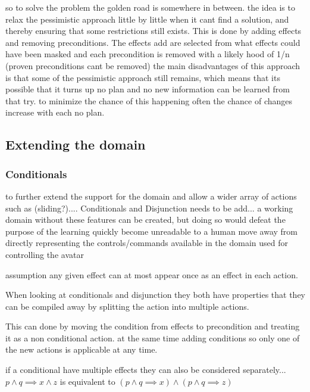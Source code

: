 so to solve the problem the golden road is somewhere in between. the idea is to relax the pessimistic approach little by little when it cant find a solution, and thereby ensuring that some restrictions still exists. This is done by adding effects and removing preconditions. The effects add are selected from what effects could have been masked and each precondition is removed with a likely hood of 1/n (proven preconditions cant be removed)
the main disadvantages of this approach is that some of the pessimistic approach still remains, which means that its possible that it turns up no plan and no new information can be learned from that try. to minimize the chance of this happening often the chance of changes increase with each no plan. 
 

\subsection{Extending the domain}
\subsubsection{Conditionals}	

	to further extend the support for the domain and allow a wider array of actions such as (sliding?).... Conditionals and Disjunction needs to be add... a working domain without these features can be created, but doing so would defeat the purpose of the learning
	quickly become unreadable to a human 
	move away from directly representing the controls/commands available in the domain used for controlling the avatar

	assumption any given effect can at most appear once as an effect in each action.

	When looking at conditionals and disjunction they both have properties that they can be compiled away by splitting the action into multiple actions. %
	
	This can done by moving the condition from effects to precondition and treating it as a non conditional action. at the same time adding conditions so only one of the new actions is applicable at any time.
	
	if a conditional have multiple effects they can also be considered separately...
	$p \land q \implies x \land z$
	is equivalent to 
	$(p \land q \implies x)
	\land
	(p \land q \implies z)$
	
